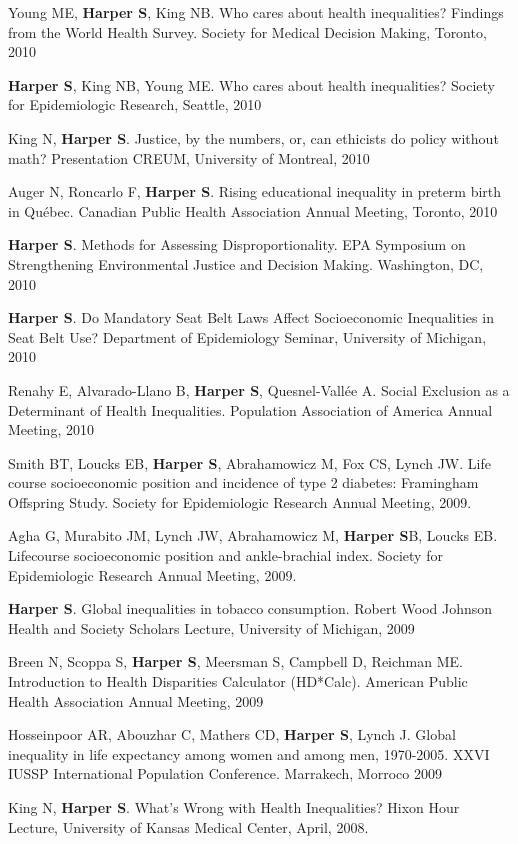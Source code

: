 \documentclass[
  letterpaper,
  DIV=11,
  numbers=noendperiod]{scrartcl}
\begin{document}
Young ME, \textbf{Harper S}, King NB. Who cares about health
inequalities? Findings from the World Health Survey. Society for Medical
Decision Making, Toronto, 2010

\textbf{Harper S}, King NB, Young ME. Who cares about health
inequalities? Society for Epidemiologic Research, Seattle, 2010

King N, \textbf{Harper S}. Justice, by the numbers, or, can ethicists do
policy without math? Presentation CREUM, University of Montreal, 2010

Auger N, Roncarlo F, \textbf{Harper S}. Rising educational inequality in
preterm birth in Québec. Canadian Public Health Association Annual
Meeting, Toronto, 2010

\textbf{Harper S}. Methods for Assessing Disproportionality. EPA
Symposium on Strengthening Environmental Justice and Decision Making.
Washington, DC, 2010

\textbf{Harper S}. Do Mandatory Seat Belt Laws Affect Socioeconomic
Inequalities in Seat Belt Use? Department of Epidemiology Seminar,
University of Michigan, 2010

Renahy E, Alvarado-Llano B, \textbf{Harper S}, Quesnel-Vallée A. Social
Exclusion as a Determinant of Health Inequalities. Population
Association of America Annual Meeting, 2010

Smith BT, Loucks EB, \textbf{Harper S}, Abrahamowicz M, Fox CS, Lynch
JW. Life course socioeconomic position and incidence of type 2 diabetes:
Framingham Offspring Study. Society for Epidemiologic Research Annual
Meeting, 2009.

Agha G, Murabito JM, Lynch JW, Abrahamowicz M, \textbf{Harper S}B,
Loucks EB. Lifecourse socioeconomic position and ankle-brachial index.
Society for Epidemiologic Research Annual Meeting, 2009.

\textbf{Harper S}. Global inequalities in tobacco consumption. Robert
Wood Johnson Health and Society Scholars Lecture, University of
Michigan, 2009

Breen N, Scoppa S, \textbf{Harper S}, Meersman S, Campbell D, Reichman
ME. Introduction to Health Disparities Calculator (HD*Calc). American
Public Health Association Annual Meeting, 2009

Hosseinpoor AR, Abouzhar C, Mathers CD, \textbf{Harper S}, Lynch J.
Global inequality in life expectancy among women and among men,
1970-2005. XXVI IUSSP International Population Conference. Marrakech,
Morroco 2009

King N, \textbf{Harper S}. What's Wrong with Health Inequalities? Hixon
Hour Lecture, University of Kansas Medical Center, April, 2008.
\end{document}
